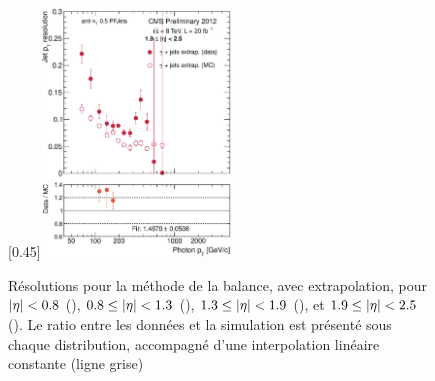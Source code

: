 \begin{figure}[p]
    \subcaptionbox{\label{fig:reso_bal_extrap_eta1925}}[0.45\textwidth]{\includegraphics[width=0.45\textwidth]{chapitre4/figs/reso_balancing_extrap/resolution_eta1925_balancing_extrap.eps}}
    \caption{Résolutions pour la méthode de la balance, avec extrapolation, pour $\lvert \eta \rvert < \num{0.8}$ (), $\num{0.8} \leq \lvert \eta \rvert < \num{1.3}$ (), $\num{1.3} \leq \lvert \eta \rvert < \num{1.9}$ (), et $\num{1.9} \leq \lvert \eta \rvert < \num{2.5}$ (). Le ratio entre les données et la simulation est présenté sous chaque distribution, accompagné d'une interpolation linéaire constante (ligne grise)}
    \label{fig:balancing_extrap_reso}
\end{figure}